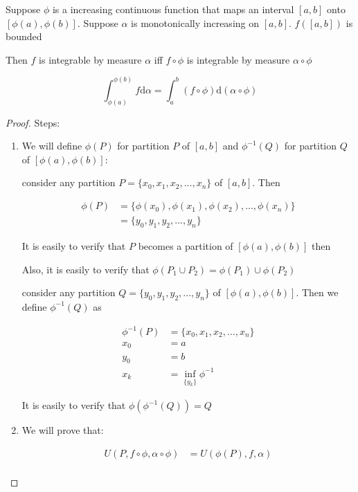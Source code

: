 \begin{thm}
    \label{thm:int-change-of-variable-1}
    Suppose $\phi$ is a increasing continuous function that maps an interval $[a,b]$ onto $[\phi(a),\phi(b)]$.
    Suppose $\alpha$ is monotonically increasing on $[a,b]$. $f([a,b])$ is bounded

    Then $f $ is integrable by measure $\alpha$ iff $f \circ \phi$ is integrable by measure $\alpha \circ \phi$

    \[
 \int_{\phi(a)}^{\phi(b)} f \mathrm{d}\alpha =       \int_a^b \left(f \circ \phi \right) \mathrm{d} \left(\alpha \circ \phi\right) 
    \]
\end{thm}

\begin{proof}
    Steps:

    \begin{enumerate}
        \item We will define $\phi(P)$ for partition $P$ of $[a,b]$ and $\phi^{-1}(Q)$ for partition $Q$ of $[\phi(a), \phi(b)]$:


    consider any partition $P = \{x_0,x_1,x_2,...,x_n \}$ of $[a,b]$. Then 
    
    \begin{align*}
        \phi(P) &= \{\phi(x_0),\phi(x_1), \phi(x_2), ..., \phi(x_n) \} \\
        &= \{y_0,y_1,y_2,...,y_n \}
    \end{align*}

    It is easily to verify that $P$ becomes a partition of $[\phi(a), \phi(b)]$ then

    Also, it is easily to verify that $\phi(P_1 \cup P_2) = \phi(P_1) \cup \phi(P_2)$

    consider any partition $Q = \{y_0,y_1,y_2,...,y_n \}$ of $[\phi(a),\phi(b)]$. Then we define $\phi^{-1}(Q)$ as 

    \begin{align*}
        \phi^{-1}(P) &= \{ x_0, x_1,x_2,...,x_n \}  \\
        x_0 &= a \\
        y_0 &= b \\
        x_k & = \inf_{\{ y_k \}} \phi^{-1} 
    \end{align*}

    It is easily to verify that $\phi(\phi^{-1}(Q)) = Q$

    \item We will prove that:
    
    \begin{align*}
        U(P, f \circ \phi, \alpha \circ \phi) &= U(\phi(P), f, \alpha) \\
    \end{align*}


\end{enumerate}
\end{proof}
